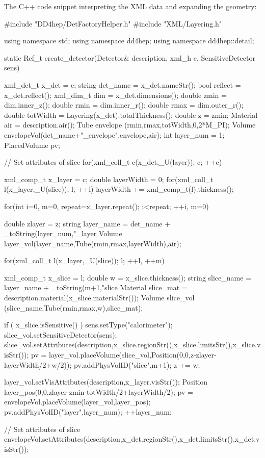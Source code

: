 \documentclass[10pt,a4paper]{article}
\begin{document}
\vspace{0.1cm}
\noindent
The C++ code snippet interpreting the XML data and expanding the geometry:
\vspace{0.1cm}
\begin{code}
#include "DD4hep/DetFactoryHelper.h"
#include "XML/Layering.h"

using namespace std;
using namespace dd4hep;
using namespace dd4hep::detail;

static Ref_t create_detector(Detector& description, xml_h e, SensitiveDetector sens)  {
  xml_det_t  x_det     = e;
  string     det_name  = x_det.nameStr();
  bool       reflect   = x_det.reflect();
  xml_dim_t  dim       = x_det.dimensions();
  double     zmin      = dim.inner_z();
  double     rmin      = dim.inner_r();
  double     rmax      = dim.outer_r();
  double     totWidth  = Layering(x_det).totalThickness();
  double     z         = zmin;
  Material   air       = description.air();
  Tube       envelope   (rmin,rmax,totWidth,0,2*M_PI);
  Volume     envelopeVol(det_name+"_envelope",envelope,air);
  int        layer_num = 1;
  PlacedVolume pv;

  // Set attributes of slice
  for(xml_coll_t c(x_det,_U(layer)); c; ++c)  {
    xml_comp_t x_layer = c;
    double layerWidth = 0;
    for(xml_coll_t l(x_layer,_U(slice)); l; ++l)
      layerWidth += xml_comp_t(l).thickness();

    for(int i=0, m=0, repeat=x_layer.repeat(); i<repeat; ++i, m=0)  {
      double     zlayer = z;
      string     layer_name = det_name + _toString(layer_num,"_layer%
      Volume     layer_vol(layer_name,Tube(rmin,rmax,layerWidth),air);
        
      for(xml_coll_t l(x_layer,_U(slice)); l; ++l, ++m)  {
        xml_comp_t x_slice = l;
        double     w = x_slice.thickness();
        string     slice_name = layer_name + _toString(m+1,"slice%
        Material   slice_mat  = description.material(x_slice.materialStr());
        Volume     slice_vol (slice_name,Tube(rmin,rmax,w),slice_mat);
          
        if ( x_slice.isSensitive() )  {
          sens.setType("calorimeter");
          slice_vol.setSensitiveDetector(sens);
        }
        slice_vol.setAttributes(description,x_slice.regionStr(),x_slice.limitsStr(),x_slice.visStr());
        pv = layer_vol.placeVolume(slice_vol,Position(0,0,z-zlayer-layerWidth/2+w/2));
        pv.addPhysVolID("slice",m+1);
        z += w;
      }
      layer_vol.setVisAttributes(description,x_layer.visStr());
      Position layer_pos(0,0,zlayer-zmin-totWidth/2+layerWidth/2);
      pv = envelopeVol.placeVolume(layer_vol,layer_pos);
      pv.addPhysVolID("layer",layer_num);
      ++layer_num;
    }
  }
  // Set attributes of slice
  envelopeVol.setAttributes(description,x_det.regionStr(),x_det.limitsStr(),x_det.visStr());

}
\end{code}
\end{document}
